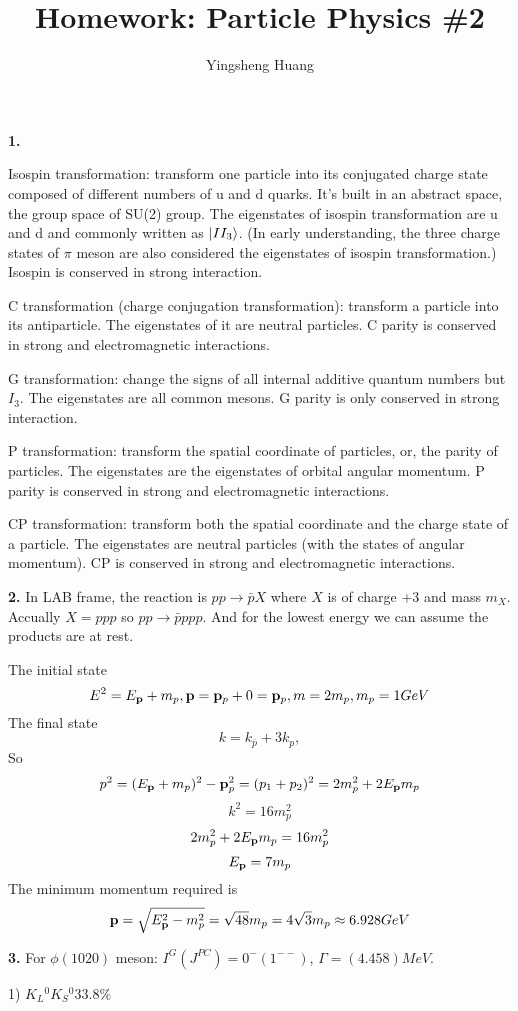\documentclass{article}
\title{Homework: Particle Physics \#2}
\author{Yingsheng Huang}
\begin{document}
\maketitle
{\bf1.}\quad

Isospin transformation: transform one particle into its conjugated charge state composed of different numbers of u and d quarks. It's built in an abstract space, the group space of SU(2) group. The eigenstates of isospin transformation are u and d and commonly written as $\ket{II_3}$. (In early understanding, the three charge states of $\pi$ meson are also considered the eigenstates of isospin transformation.) Isospin is conserved in strong interaction.

C transformation (charge conjugation transformation): transform a particle into its antiparticle. The eigenstates of it are neutral particles. C parity is conserved in strong and electromagnetic interactions.

G transformation: change the signs of all internal additive quantum numbers but $I_3$. The eigenstates are all common mesons. G parity is only conserved in strong interaction.

P transformation: transform the spatial coordinate of particles, or, the parity of particles. The eigenstates are the eigenstates of orbital angular momentum. P parity is conserved in strong and electromagnetic interactions.

CP transformation: transform both the spatial coordinate and the charge state of a particle. The eigenstates are neutral particles (with the states of angular momentum). CP is conserved in strong and electromagnetic interactions.

{\bf2.}\quad
In LAB frame, the reaction is $pp\rightarrow\bar pX$ where $X$ is of charge +3 and mass $m_X$. Accually $X=ppp$ so $pp\rightarrow\bar pppp$. And for the lowest energy we can assume the products are at rest.

The initial state
$$E^2=E_{\vb{p}}+m_p,\vb{p}=\vb{p}_p+0=\vb{p}_p,m=2m_p,m_p=1GeV$$
The final state
$$k=k_{\bar p}+3k_{p},$$
So
$$p^2=(E_{\vb{p}}+m_p)^2-\vb{p}_p^2=(p_1+p_2)^2=2m_p^2+2E_{\vb{p}}m_p$$
$$k^2=16m_p^2$$
$$2m_p^2+2E_{\vb{p}}m_p=16m_p^2$$
$$E_{\vb{p}}=7m_p$$
The minimum momentum required is
$$\vb{p}=\sqrt{E_{\vb{p}}^2-m_p^2}=\sqrt{48}m_p=4\sqrt{3}m_p\approx6.928GeV$$

{\bf3.}\quad
For $\phi(1020)$ meson: $I^G(J^{PC})=0^-(1^{--})$, $\Gamma=(4.458)MeV$.

1) $K_L{ }^0K_S{ }^0$\quad$33.8\%$
\end{document}
